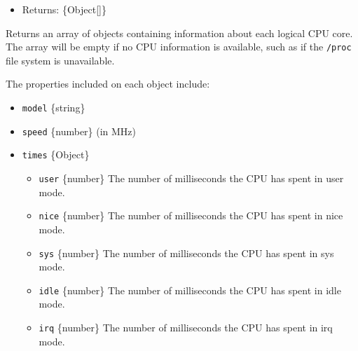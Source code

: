 \begin{itemize}
\tightlist
\item
  Returns: \{Object{[}{]}\}
\end{itemize}

Returns an array of objects containing information about each logical
CPU core. The array will be empty if no CPU information is available,
such as if the \texttt{/proc} file system is unavailable.

The properties included on each object include:

\begin{itemize}
\tightlist
\item
  \texttt{model} \{string\}
\item
  \texttt{speed} \{number\} (in MHz)
\item
  \texttt{times} \{Object\}

  \begin{itemize}
  \tightlist
  \item
    \texttt{user} \{number\} The number of milliseconds the CPU has
    spent in user mode.
  \item
    \texttt{nice} \{number\} The number of milliseconds the CPU has
    spent in nice mode.
  \item
    \texttt{sys} \{number\} The number of milliseconds the CPU has spent
    in sys mode.
  \item
    \texttt{idle} \{number\} The number of milliseconds the CPU has
    spent in idle mode.
  \item
    \texttt{irq} \{number\} The number of milliseconds the CPU has spent
    in irq mode.
  \end{itemize}
\end{itemize}

